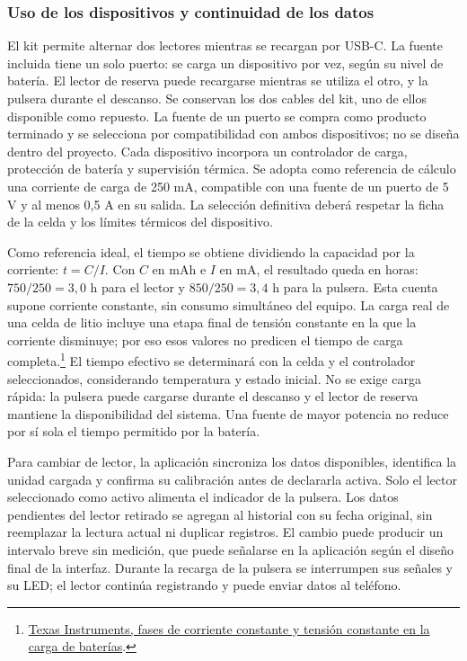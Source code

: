 \subsubsection{Uso de los dispositivos y continuidad de los datos}\label{sec:uso-dispositivos}
El kit permite alternar dos lectores mientras se recargan por USB-C. La fuente incluida tiene un solo puerto: se carga un dispositivo por vez, según su nivel de batería. El lector de reserva puede recargarse mientras se utiliza el otro, y la pulsera durante el descanso. Se conservan los dos cables del kit, uno de ellos disponible como repuesto. La fuente de un puerto se compra como producto terminado y se selecciona por compatibilidad con ambos dispositivos; no se diseña dentro del proyecto. Cada dispositivo incorpora un controlador de carga, protección de batería y supervisión térmica. Se adopta como referencia de cálculo una corriente de carga de 250 mA, compatible con una fuente de un puerto de 5 V y al menos 0,5 A en su salida. La selección definitiva deberá respetar la ficha de la celda y los límites térmicos del dispositivo.

Como referencia ideal, el tiempo se obtiene dividiendo la capacidad por la corriente: $t=C/I$. Con $C$ en mAh e $I$ en mA, el resultado queda en horas: $750/250=3{,}0$ h para el lector y $850/250=3{,}4$ h para la pulsera. Esta cuenta supone corriente constante, sin consumo simultáneo del equipo. La carga real de una celda de litio incluye una etapa final de tensión constante en la que la corriente disminuye; por eso esos valores no predicen el tiempo de carga completa.\footnote{\href{https://www.ti.com/document-viewer/lit/html/SSZTA38}{Texas Instruments, fases de corriente constante y tensión constante en la carga de baterías}.} El tiempo efectivo se determinará con la celda y el controlador seleccionados, considerando temperatura y estado inicial. No se exige carga rápida: la pulsera puede cargarse durante el descanso y el lector de reserva mantiene la disponibilidad del sistema. Una fuente de mayor potencia no reduce por sí sola el tiempo permitido por la batería.

Para cambiar de lector, la aplicación sincroniza los datos disponibles, identifica la unidad cargada y confirma su calibración antes de declararla activa. Solo el lector seleccionado como activo alimenta el indicador de la pulsera. Los datos pendientes del lector retirado se agregan al historial con su fecha original, sin reemplazar la lectura actual ni duplicar registros. El cambio puede producir un intervalo breve sin medición, que puede señalarse en la aplicación según el diseño final de la interfaz. Durante la recarga de la pulsera se interrumpen sus señales y su LED; el lector continúa registrando y puede enviar datos al teléfono.

